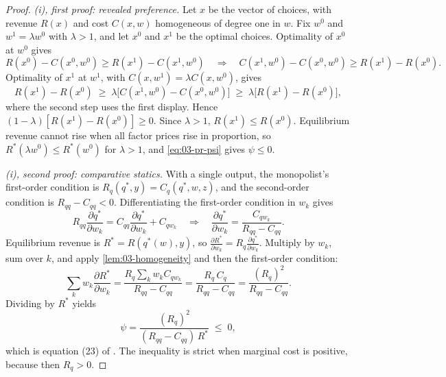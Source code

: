 \begin{proof}
\emph{(i), first proof: revealed preference.} Let $x$ be the vector of choices, with revenue $R(x)$ and cost
$C(x, w)$ homogeneous of degree one in $w$. Fix $w^0$ and $w^1 = \lambda w^0$ with $\lambda > 1$, and let $x^0$
and $x^1$ be the optimal choices. Optimality of $x^0$ at $w^0$ gives
\begin{equation*}
  R(x^0) - C(x^0, w^0) \ge R(x^1) - C(x^1, w^0)
  \quad\Longrightarrow\quad
  C(x^1, w^0) - C(x^0, w^0) \ge R(x^1) - R(x^0).
\end{equation*}
Optimality of $x^1$ at $w^1$, with $C(x, w^1) = \lambda C(x, w^0)$, gives
\begin{equation*}
  R(x^1) - R(x^0) \;\ge\; \lambda\bigl[C(x^1, w^0) - C(x^0, w^0)\bigr] \;\ge\; \lambda\bigl[R(x^1) -
  R(x^0)\bigr],
\end{equation*}
where the second step uses the first display. Hence $(1 - \lambda)[R(x^1) - R(x^0)] \ge 0$. Since $\lambda >
1$, $R(x^1) \le R(x^0)$. Equilibrium revenue cannot rise when all factor prices rise in proportion, so
$R^*(\lambda w^0) \le R^*(w^0)$ for $\lambda > 1$, and \eqref{eq:03-pr-psi} gives $\psi \le 0$.

\emph{(i), second proof: comparative statics.} With a single output, the monopolist's first-order condition
is $R_q(q^*, y) = C_q(q^*, w, z)$, and the second-order condition is $R_{qq} - C_{qq} < 0$. Differentiating the
first-order condition in $w_k$ gives
\begin{equation*}
  R_{qq}\frac{\partial q^*}{\partial w_k} = C_{qq}\frac{\partial q^*}{\partial w_k} + C_{q w_k}
  \quad\Longrightarrow\quad
  \frac{\partial q^*}{\partial w_k} = \frac{C_{q w_k}}{R_{qq} - C_{qq}} .
\end{equation*}
Equilibrium revenue is $R^* = R(q^*(w), y)$, so $\frac{\partial R^*}{\partial w_k} = R_q \frac{\partial
q^*}{\partial w_k}$. Multiply by $w_k$, sum over $k$, and apply \cref{lem:03-homogeneity} and then the
first-order condition:
\begin{equation*}
  \sum_k w_k \frac{\partial R^*}{\partial w_k}
  = \frac{R_q \sum_k w_k C_{q w_k}}{R_{qq} - C_{qq}}
  = \frac{R_q\, C_q}{R_{qq} - C_{qq}}
  = \frac{(R_q)^2}{R_{qq} - C_{qq}} .
\end{equation*}
Dividing by $R^*$ yields
\begin{equation}\label{eq:03-pr-monopoly}
  \psi = \frac{(R_q)^2}{(R_{qq} - C_{qq})\, R^*} \;\le\; 0,
\end{equation}
which is equation (23) of \citet{Bresnahan1989}. The inequality is strict when marginal cost is positive,
because then $R_q > 0$.


\end{proof}
